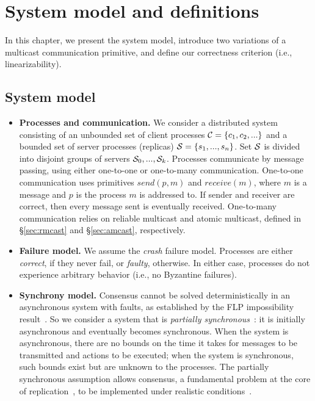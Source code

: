 \chapter[System model and definitions]{System model and definitions}
\label{sec:sysmodel}

In this chapter, we present the system model, introduce two variations of a
multicast communication primitive, and define our correctness criterion (i.e.,
linearizability).

\section{System model}

\begin{itemize}
  \item \textbf{Processes and communication.} We consider a distributed system
  consisting of an unbounded set of client processes $\mathcal{C} = \{c_1, c_2, ...\}$
  and a bounded set of server processes (replicas) $\mathcal{S} = \{s_1, ..., s_n\}$.
  Set $\mathcal{S}$ is divided into disjoint groups of servers $\mathcal{S}_0, ..., \mathcal{S}_k$.
  Processes communicate by message passing, using either one-to-one or
  one-to-many communication. One-to-one communication uses primitives
  $send(p,m)$ and $receive(m)$, where $m$ is a message and $p$ is the process
  $m$ is addressed to. If sender and receiver are correct, then every message
  sent is eventually received. One-to-many communication relies on reliable
  multicast and atomic multicast, defined in \S\ref{sec:rmcast} and
  \S\ref{sec:amcast}, respectively.
  \item \textbf{Failure model.} We assume the \emph{crash} failure model.
  Processes are either \emph{correct}, if they never fail, or \emph{faulty},
  otherwise. In either case, processes do not experience arbitrary behavior
  (i.e., no Byzantine failures).
  \item \textbf{Synchrony model.} Consensus cannot be solved deterministically
  in an asynchronous system with faults, as established by the FLP
  impossibility result~\cite{FLP85}. So we consider a system that is
  \emph{partially synchronous}~\cite{DLS88}: it is initially asynchronous and
  eventually becomes synchronous. When the system is asynchronous, there are no
  bounds on the time it takes for messages to be transmitted and actions to be
  executed; when the system  is synchronous, such bounds exist but are unknown
  to the processes. The partially synchronous assumption allows consensus, a
  fundamental problem at the core of replication~\cite{Lam98,Sch90}, to be
  implemented under realistic conditions~\cite{FLP85,Lam98}.
\end{itemize}

